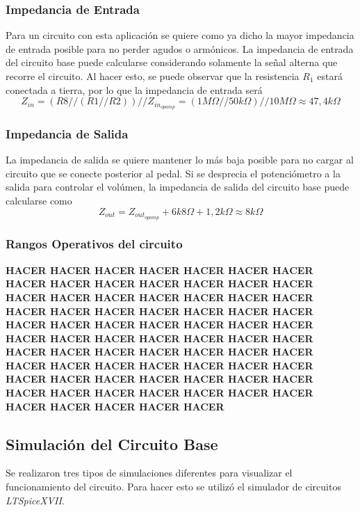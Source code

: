 \subsubsection{Impedancia de Entrada}

Para un circuito con esta aplicación se quiere como ya dicho la mayor impedancia de entrada posible para no perder agudos o armónicos.
La impedancia de entrada del circuito base puede calcularse considerando solamente la señal alterna que recorre el circuito. Al hacer esto, se puede observar que la resistencia $R_1$ estará conectada a tierra, por lo que la impedancia de entrada será
\[Z_{in} = (R8//(R1//R2))//Z_{in_{opamp}} = (1M\Omega // 50k\Omega)//10M\Omega \approx 47,4k\Omega\]

\subsubsection{Impedancia de Salida}

La impedancia de salida se quiere mantener lo más baja posible para no cargar al circuito que se conecte posterior al pedal.
Si se desprecia el potenciómetro a la salida para controlar el volúmen, la impedancia de salida del circuito base puede calcularse como
\[ Z_{out} = Z_{out_{opamp}} + 6k8\Omega + 1,2k\Omega \approx 8k\Omega \]

\subsubsection{Rangos Operativos del circuito}

\textbf{HACER HACER HACER HACER HACER HACER HACER HACER HACER HACER HACER HACER HACER HACER HACER HACER HACER HACER HACER HACER HACER HACER HACER HACER HACER HACER HACER HACER HACER HACER HACER HACER HACER HACER HACER HACER HACER HACER HACER HACER HACER HACER HACER HACER HACER HACER HACER HACER HACER HACER HACER HACER HACER HACER HACER HACER HACER HACER HACER HACER HACER HACER HACER HACER HACER HACER HACER HACER HACER HACER HACER HACER HACER HACER HACER }

\subsection{Simulación del Circuito Base}

Se realizaron tres tipos de simulaciones diferentes para visualizar el funcionamiento del circuito. Para hacer esto se utilizó el simulador de circuitos \textit{LTSpiceXVII}.

